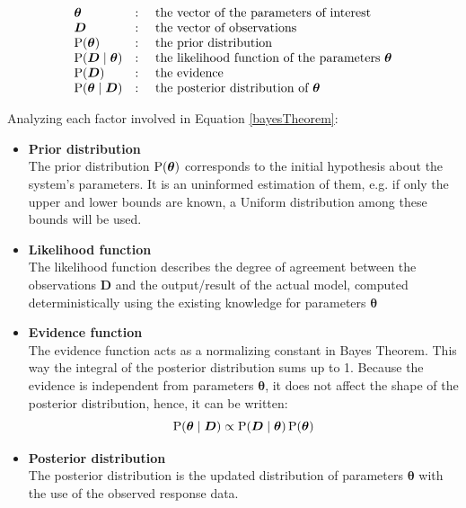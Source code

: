 \begin{equation*}
    \begin{array}{lll}
        \boldsymbol{\theta} & : & \text{ the vector of the parameters of interest} \\ 
        \boldsymbol{D} & : & \text { the vector of observations} \\ 
        \text{P}(\boldsymbol{\theta}) & : & \text { the prior distribution } \\ 
        \text{P}(\boldsymbol{D}\mid \boldsymbol{\theta}) & : & \text { the likelihood function of the parameters } \boldsymbol{\theta}\\ 
        \text{P}(\boldsymbol{D}) & : & \text{ the evidence}\\
        \text{P}(\boldsymbol{\theta} \mid \boldsymbol{D}) & : & \text{ the posterior distribution of } \boldsymbol{\theta}
    \end{array}
\end{equation*}

Analyzing each factor involved in Equation \ref{bayesTheorem}:

\begin{itemize}
    \item \textbf{Prior distribution}\\
        The prior distribution $\text{P}(\boldsymbol{\theta})$ corresponds to the initial hypothesis about the system's parameters. It is an uninformed estimation of them, e.g. if only the upper and lower bounds are known, a Uniform distribution among these bounds will be used.
    \item \textbf{Likelihood function}\\
        The likelihood function describes the degree of agreement between the observations $\boldsymbol{D}$ and the output/result of the actual model, computed deterministically using the existing knowledge for parameters $\boldsymbol{\theta}$
    \item \textbf{Evidence function}\\
        The evidence function acts as a normalizing constant in Bayes Theorem. This way the integral of the posterior distribution sums up to 1. Because the evidence is independent from parameters $\boldsymbol{\theta}$, it does not affect the shape of the posterior distribution, hence, it can be written:
        \begin{equation}
            \text{P}(\boldsymbol{\theta} \mid \boldsymbol{D}) \propto \text{P}(\boldsymbol{D} \mid \boldsymbol{\theta}) \, \text{P}(\boldsymbol{\theta})
        \end{equation}
    \item \textbf{Posterior distribution}\\
        The posterior distribution is the updated distribution of parameters $\boldsymbol{\theta}$ with the use of the observed response data. 
\end{itemize}

